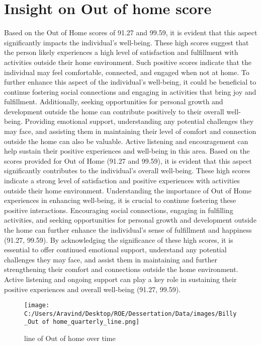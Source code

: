 \documentclass[10pt, a4paper]{article}%
\begin{document}
\section{Insight on Out of home score}%
\label{sec:InsightonOutofhomescore}%
Based on the Out of Home scores of 91.27 and 99.59, it is evident that this aspect significantly impacts the individual's well{-}being. These high scores suggest that the person likely experiences a high level of satisfaction and fulfillment with activities outside their home environment. Such positive scores indicate that the individual may feel comfortable, connected, and engaged when not at home.\newline%
\newline%
To further enhance this aspect of the individual's well{-}being, it could be beneficial to continue fostering social connections and engaging in activities that bring joy and fulfillment. Additionally, seeking opportunities for personal growth and development outside the home can contribute positively to their overall well{-}being.\newline%
\newline%
Providing emotional support, understanding any potential challenges they may face, and assisting them in maintaining their level of comfort and connection outside the home can also be valuable. Active listening and encouragement can help sustain their positive experiences and well{-}being in this area.\newline%
\newline%
Based on the scores provided for Out of Home (91.27 and 99.59), it is evident that this aspect significantly contributes to the individual's overall well{-}being. These high scores indicate a strong level of satisfaction and positive experiences with activities outside their home environment. \newline%
\newline%
Understanding the importance of Out of Home experiences in enhancing well{-}being, it is crucial to continue fostering these positive interactions. Encouraging social connections, engaging in fulfilling activities, and seeking opportunities for personal growth and development outside the home can further enhance the individual's sense of fulfillment and happiness (91.27, 99.59).\newline%
\newline%
By acknowledging the significance of these high scores, it is essential to offer continued emotional support, understand any potential challenges they may face, and assist them in maintaining and further strengthening their comfort and connections outside the home environment. Active listening and ongoing support can play a key role in sustaining their positive experiences and overall well{-}being (91.27, 99.59).%
\begin{figure}[H]%
\centering%
\texttt{[image: C:/Users/Aravind/Desktop/ROE/Dessertation/Data/images/Billy\_Out of home\_quarterly\_line.png]}%
\caption{line of Out of home over time}%
\end{figure}
\end{document}
